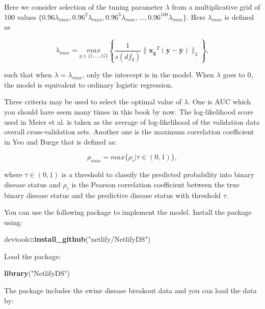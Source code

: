 \documentclass[12pt,]{krantz}
\makeatletter
\newenvironment{Shaded}{\begin{snugshade}}{\end{snugshade}}
\newcommand{\KeywordTok}[1]{\textcolor[rgb]{0.27,0.27,0.27}{\textbf{#1}}}
\newcommand{\NormalTok}[1]{#1}
\newcommand{\OperatorTok}[1]{\textcolor[rgb]{0.43,0.43,0.43}{\textbf{#1}}}
\newcommand{\StringTok}[1]{\textcolor[rgb]{0.5,0.5,0.5}{#1}}
\newenvironment{kframe}{%
\medskip{}
\setlength{\fboxsep}{.8em}
 \def\at@end@of@kframe{}%
 \ifinner\ifhmode%
  \def\at@end@of@kframe{\end{minipage}}%
  \begin{minipage}{\columnwidth}%
 \fi\fi%
 \def\FrameCommand##1{\hskip\@totalleftmargin \hskip-\fboxsep
 \colorbox{shadecolor}{##1}\hskip-\fboxsep
     \hskip-\linewidth \hskip-\@totalleftmargin \hskip\columnwidth}%
 \MakeFramed {\advance\hsize-\width
   \@totalleftmargin\z@ \linewidth\hsize
   \@setminipage}}%
 {\par\unskip\endMakeFramed%
 \at@end@of@kframe}
\renewenvironment{Shaded}{\begin{kframe}}{\end{kframe}}
\makeatother
\begin{document}
Here we consider selection of the tuning parameter \(\lambda\) from a multiplicative grid of 100 values \(\{0.96\lambda_{max},0.96^{2}\lambda_{max},0.96^{3}\lambda_{max},...,0.96^{100}\lambda_{max}\}\). Here \(\lambda_{max}\) is defined as

\begin{equation}
\lambda_{max}=\underset{g\in\{1,...,G\}}{max}\left\{\frac{1}{s(df_{g})}\parallel \mathbf{x_{g}}^{T}(\mathbf{y}-\bar{\mathbf{y}} )\parallel_{2}\right\},
\end{equation}

such that when \(\lambda=\lambda_{max}\), only the intercept is
in the model. When \(\lambda\) goes to \(0\), the model is equivalent to ordinary
logistic regression.

Three criteria may be used to select the optimal value of \(\lambda\). One is AUC which you should have seem many times in this book by now. The log-likelihood score used in Meier et al. \citep{Meier2008} is taken as the average of log-likelihood of the validation data overall cross-validation sets. Another one is the maximum correlation coefficient in Yeo and Burge \citep{Yeo2004} that is defined as:

\[
\rho_{max}=max\{\rho_{\tau}|\tau\in(0,1)\},
\]

where \(\tau\in(0,1)\) is a threshold to classify the predicted probability into binary disease status and \(\rho_\tau\) is the Pearson correlation coefficient between the true binary disease status and the predictive disease status with threshold \(\tau\).

You can use the following package to implement the model. Install the package using:

\begin{Shaded}
\begin{Highlighting}[]
\NormalTok{devtools}\OperatorTok{::}\KeywordTok{install_github}\NormalTok{(}\StringTok{"netlify/NetlifyDS"}\NormalTok{)}
\end{Highlighting}
\end{Shaded}

Load the package:

\begin{Shaded}
\begin{Highlighting}[]
\KeywordTok{library}\NormalTok{(}\StringTok{"NetlifyDS"}\NormalTok{)}
\end{Highlighting}
\end{Shaded}

The package includes the swine disease breakout data and you can load the data by:
\end{document}
